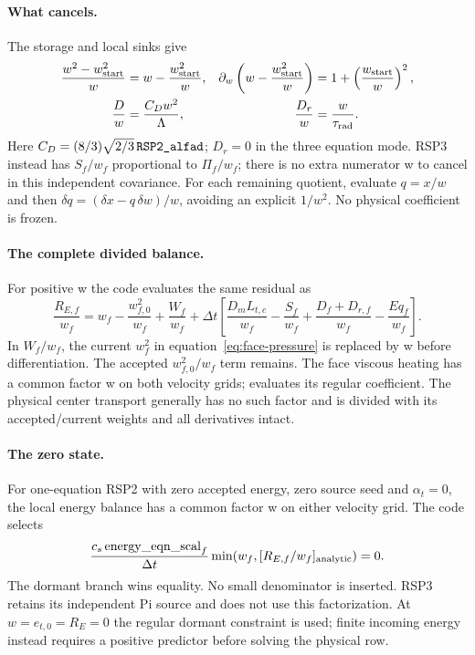 \documentclass[11pt]{article}
\newcommand{\code}[1]{\texttt{\detokenize{#1}}}
\numberwithin{equation}{section}
\begin{document}
\paragraph{What cancels.}
The storage and local sinks give
\begin{align}
 \frac{w^2-w_{\rm start}^2}{w}
   &=w-\frac{w_{\rm start}^2}{w},
 &\partial_w\left(w-\frac{w_{\rm start}^2}{w}\right)
   &=1+\left(\frac{w_{\rm start}}w\right)^2,\\
 \frac{D}{w}&=\frac{C_Dw^2}{\Lambda},
 &\frac{D_r}{w}&=\frac{w}{\tau_{\rm rad}}.
\end{align}
Here $C_D=(8/3)\sqrt{2/3}\,\code{RSP2_alfad}$; $D_r=0$ in the
three equation mode. RSP3 instead has $S_f/w_f$ proportional to $\Pi_f/w_f$;
there is no extra numerator w to cancel in this independent covariance.
For each remaining quotient, evaluate $q=x/w$ and then
$\delta q=(\delta x-q\,\delta w)/w$, avoiding an explicit $1/w^2$.
No physical coefficient is frozen.

\paragraph{The complete divided balance.}
For positive w the code evaluates the same residual as
\begin{equation}
 \frac{R_{E,f}}{w_f}=w_f-\frac{w_{f,0}^2}{w_f}
 +\frac{W_f}{w_f}
 +\Delta t\left[\frac{D_mL_{t,c}}{w_f}
 -\frac{S_f}{w_f}+\frac{D_f+D_{r,f}}{w_f}-\frac{Eq_f}{w_f}\right].
 \label{eq:factored-energy}
\end{equation}
In $W_f/w_f$, the current $w_f^2$ in equation~\eqref{eq:face-pressure}
is replaced by w before differentiation. The accepted $w_{f,0}^2/w_f$
term remains. The face viscous heating has a common factor w on both
velocity grids; \code{compute_Eq_div_w_face} evaluates its regular
coefficient. The physical center transport generally has no such factor
and is divided with its accepted/current weights and all derivatives intact.

\paragraph{The zero state.}
For one-equation RSP2 with zero accepted energy, zero source seed and
$\alpha_t=0$, the local energy balance has a common factor w on either
velocity grid. The code selects
\begin{equation}
 \frac{c_s\,\mathrm{energy\_eqn\_scal}_f}{\Delta t}
 \min(w_f,[R_{E,f}/w_f]_{\rm analytic})=0.
\end{equation}
The dormant branch wins equality. No small denominator is inserted.
RSP3 retains its independent Pi source and does not use this factorization.
At $w=e_{t,0}=R_E=0$ the regular dormant constraint is used; finite incoming
energy instead requires a positive predictor before solving the physical row.
\end{document}
